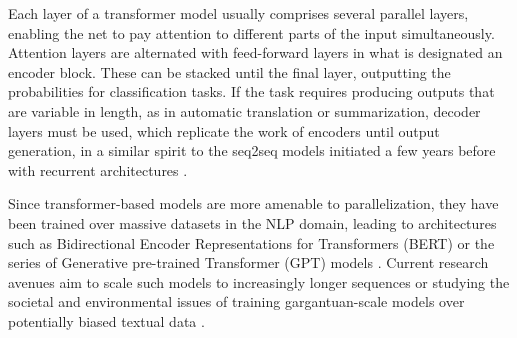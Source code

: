 Each layer of a transformer model usually comprises several 
parallel layers, enabling the net to pay attention to different parts of the input simultaneously. Attention layers are alternated with  feed-forward layers in what is designated an encoder block. These 
 can be stacked until the final layer, outputting the probabilities for classification tasks. If the task requires producing outputs that are variable in length, as in automatic translation or summarization, decoder layers must be used, which replicate the work of encoders until output generation, in a similar spirit to the seq2seq models initiated a few years before with recurrent architectures \parencite{sutskever2014sequence}.

Since transformer-based models are more amenable to parallelization,
 they have been trained over massive datasets in the NLP domain, leading to architectures such as Bidirectional 
Encoder Representations for Transformers (BERT) \parencite{devlin2018bert}
or the series of Generative
pre-trained Transformer (GPT) models \parencite{radford2018improving, radford2019language, brown2020language}. Current research avenues aim to scale such models to increasingly longer sequences \parencite{tay2020long} or studying the societal and environmental issues of training gargantuan-scale models over potentially biased textual data \parencite{bender2021dangers}.


